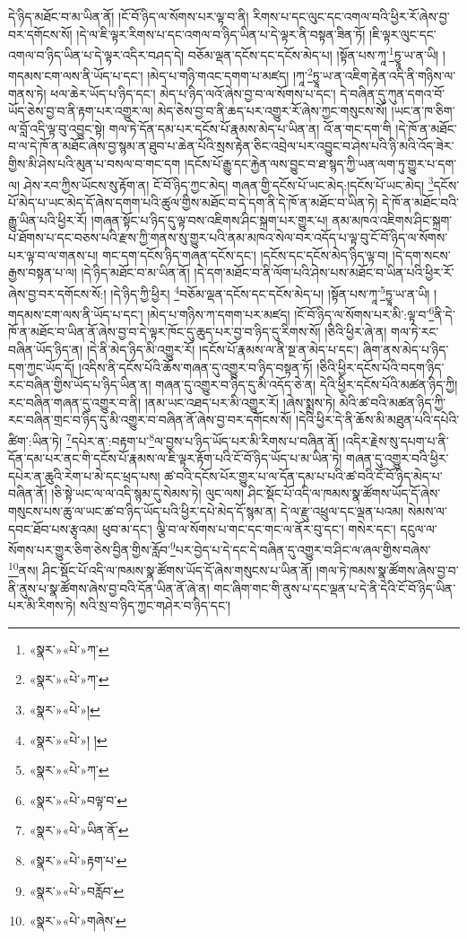 དེ་ཉིད་མཐོང་བ་མ་ཡིན་ནོ། །ངོ་བོ་ཉིད་ལ་སོགས་པར་ལྟ་བ་ནི། རིགས་པ་དང་ལུང་དང་འགལ་བའི་ཕྱིར་རོ་ཞེས་བྱ་བར་དགོངས་སོ། །དེ་ལ་ཇི་ལྟར་རིགས་པ་དང་འགལ་བ་ཉིད་ཡིན་པ་དེ་ལྟར་ནི་བསྟན་ཟིན་ཏོ། །ཇི་ལྟར་ལུང་དང་འགལ་བ་ཉིད་ཡིན་པ་དེ་ལྟར་འདིར་བཤད་དེ། བཅོམ་ལྡན་དངོས་དང་དངོས་མེད་པ། །སྟོན་པས་ཀཱ་\footnote{«སྣར་»«པེ་»ཀ་}ཏྱཱ་ཡ་ན་ཡི། །གདམས་ངག་ལས་ནི་ཡོད་པ་དང་། །མེད་པ་གཉི་གའང་དགག་པ་མཛད། །ཀཱ་\footnote{«སྣར་»«པེ་»ཀ་}ཏྱཱ་ཡ་ན་འཇིག་རྟེན་འདི་ནི་གཉིས་ལ་གནས་ཏེ། ཕལ་ཆེར་ཡོད་པ་ཉིད་དང་། མེད་པ་ཉིད་ལའོ་ཞེས་བྱ་བ་ལ་སོགས་པ་དང་། དེ་བཞིན་དུ་ཀུན་དགའ་བོ་ཡོད་ཅེས་བྱ་བ་ནི་རྟག་པར་འགྱུར་ལ། མེད་ཅེས་བྱ་བ་ནི་ཆད་པར་འགྱུར་རོ་ཞེས་ཀྱང་གསུངས་སོ། །ཡང་ན་ཁ་ཅིག་ལ་བློ་འདི་ལྟ་བུ་འབྱུང་སྟེ། གལ་ཏེ་དོན་དམ་པར་དངོས་པོ་རྣམས་མེད་པ་ཡིན་ན། འོ་ན་གང་དག་གི །དེ་ཁོ་ན་མཐོང་བ་ལ་དེ་ཁོ་ན་མཐོང་ཞེས་བྱ་སྙམ་ན་ཐུབ་པ་ཆེན་པོའི་སྲས་རྟེན་ཅིང་འབྲེལ་པར་འབྱུང་བ་ཤེས་པའི་ཉི་མའི་འོད་ཟེར་གྱིས་མི་ཤེས་པའི་མུན་པ་བསལ་བ་གང་དག །དངོས་པོ་རྒྱུ་དང་རྐྱེན་ལས་བྱུང་བ་ཐ་སྙད་ཀྱི་ཡན་ལག་ཏུ་གྱུར་པ་དག་ལ། ཤེས་རབ་ཀྱིས་ཡོངས་སུ་རྟོག་ན། ངོ་བོ་ཉིད་ཀྱང་མེད། གཞན་གྱི་དངོས་པོ་ཡང་མེད:།དངོས་པོ་ཡང་མེད། \footnote{«སྣར་»«པེ་»། }དངོས་པོ་མེད་པ་ཡང་མེད་དོ་ཞེས་དགག་པའི་ཚུལ་གྱིས་མཐོང་བ་དེ་དག་ནི་དེ་ཁོ་ན་མཐོང་བ་ཡིན་ཏེ། དེ་ཁོ་ན་མཐོང་བའི་རྒྱུ་ཡིན་པའི་ཕྱིར་རོ། །གཞན་སྟོང་པ་ཉིད་དུ་ལྟ་བས་འཇིགས་ཤིང་སྐྲག་པར་གྱུར་པ། ནམ་མཁའ་འཇིགས་ཤིང་སྐྲག་པ་ཐོགས་པ་དང་བཅས་པའི་རྫས་ཀྱི་གནས་སུ་གྱུར་པའི་ནམ་མཁའ་སེལ་བར་འདོད་པ་ལྟ་བུ་ངོ་བོ་ཉིད་ལ་སོགས་པར་ལྟ་བ་ལ་གནས་པ། གང་དག་དངོས་ཉིད་གཞན་དངོས་དང་། །དངོས་དང་དངོས་མེད་ཉིད་ལྟ་བ། །དེ་དག་སངས་རྒྱས་བསྟན་པ་ལ། །དེ་ཉིད་མཐོང་བ་མ་ཡིན་ནོ། །དེ་དག་མཐོང་བ་ནི་ལོག་པའི་ཤེས་པས་མཐོང་བ་ཡིན་པའི་ཕྱིར་རོ་ཞེས་བྱ་བར་དགོངས་སོ:། །དེ་ཉིད་ཀྱི་ཕྱིར། \footnote{«སྣར་»«པེ་»། ། }བཅོམ་ལྡན་དངོས་དང་དངོས་མེད་པ། །སྟོན་པས་ཀཱ་\footnote{«སྣར་»«པེ་»ཀ་}ཏྱཱ་ཡ་ན་ཡི། །གདམས་ངག་ལས་ནི་ཡོད་པ་དང་། །མེད་པ་གཉིས་ཀ་དགག་པར་མཛད། །ངོ་བོ་ཉིད་ལ་སོགས་པར་མི་:ལྟ་བ་\footnote{«སྣར་»«པེ་»བལྟ་བ་}ནི་དེ་ཁོ་ན་མཐོང་བ་ཡིན་ནོ་ཞེས་བྱ་བ་དེ་ལྟར་ཁོང་དུ་ཆུད་པར་བྱ་བ་ཉིད་དུ་རིགས་སོ། །ཅིའི་ཕྱིར་ཞེ་ན། གལ་ཏེ་རང་བཞིན་ཡོད་ཉིད་ན། །དེ་ནི་མེད་ཉིད་མི་འགྱུར་རོ། །དངོས་པོ་རྣམས་ལ་ནི་སྔ་ན་མེད་པ་དང་། ཞིག་ནས་མེད་པ་ཉིད་དག་ཀྱང་ཡོད་དོ། །འདིས་ནི་དངོས་པོའི་ཆོས་གཞན་དུ་འགྱུར་བ་ཉིད་བསྟན་ཏོ། །ཅིའི་ཕྱིར་དངོས་པོའི་བདག་ཉིད་རང་བཞིན་གྱིས་ཡོད་པ་ཉིད་ཡིན་ན། གཞན་དུ་འགྱུར་བ་ཉིད་དུ་མི་འདོད་ཅེ་ན། དེའི་ཕྱིར་དངོས་པོའི་མཚན་ཉིད་ཀྱི། རང་བཞིན་གཞན་དུ་འགྱུར་བ་ནི། །ནམ་ཡང་འཐད་པར་མི་འགྱུར་རོ། །ཞེས་སྨྲས་ཏེ། མེའི་ཚ་བའི་མཚན་ཉིད་ཀྱི་རང་བཞིན་གྲང་བ་ཉིད་དུ་མི་འགྱུར་བ་བཞིན་ནོ་ཞེས་བྱ་བར་དགོངས་སོ། །དེའི་ཕྱིར་དེ་ནི་ཆོས་མི་མཐུན་པའི་དཔེའི་ཚིག་:ཡིན་ཏེ། \footnote{«སྣར་»«པེ་»ཡིན་ནོ་}དཔེར་ན་:བརྟག་པ་\footnote{«སྣར་»«པེ་»རྟག་པ་}ལ་བྱས་པ་ཉིད་ཡོད་པར་མི་རིགས་པ་བཞིན་ནོ། །འདིར་རྗེས་སུ་དཔག་པ་ནི་དོན་དམ་པར་ནང་གི་དངོས་པོ་རྣམས་ལ་ཇི་ལྟར་རྟོག་པའི་ངོ་བོ་ཉིད་ཡོད་པ་མ་ཡིན་ཏེ། གཞན་དུ་འགྱུར་བའི་ཕྱིར་དཔེར་ན་ཆུའི་རེག་པ་མེ་དང་ཕྲད་པས། ཚ་བའི་དངོས་པོར་གྱུར་པ་ལ་དོན་དམ་པ་པའི་ཚ་བའི་ངོ་བོ་ཉིད་མེད་པ་བཞིན་ནོ། །ཅི་སྟེ་ཡང་ལ་ལ་འདི་སྙམ་དུ་སེམས་ཏེ། ལུང་ལས། ཤིང་སྡོང་པོ་འདི་ལ་ཁམས་སྣ་ཚོགས་ཡོད་དོ་ཞེས་གསུངས་པས་ཆུ་ལ་ཡང་ཚ་བ་ཉིད་ཡོད་པའི་ཕྱིར་དཔེ་མེད་དོ་སྙམ་ན། དེ་ལ་རྫུ་འཕྲུལ་དང་ལྡན་པའམ། སེམས་ལ་དབང་ཐོབ་པས་རྩྭའམ། ཕུབ་མ་དང་། ལྕི་བ་ལ་སོགས་པ་གང་དང་གང་ལ་ནོར་བུ་དང་། གསེར་དང་། དངུལ་ལ་སོགས་པར་གྱུར་ཅིག་ཅེས་བྱིན་གྱིས་རློབ་\footnote{«སྣར་»«པེ་»བརློབ་}པར་བྱེད་པ་དེ་དང་དེ་བཞིན་དུ་འགྱུར་བ་ཤིང་ལ་ཞལ་གྱིས་བཞེས་\footnote{«སྣར་»«པེ་»གཞེས་}ནས། ཤིང་སྡོང་པོ་འདི་ལ་ཁམས་སྣ་ཚོགས་ཡོད་དོ་ཞེས་གསུངས་པ་ཡིན་ནོ། །གལ་ཏེ་ཁམས་སྣ་ཚོགས་ཞེས་བྱ་བ་ནི་ནུས་པ་སྣ་ཚོགས་ཞེས་བྱ་བའི་དོན་ཡིན་ནོ་ཞེ་ན། གང་ཞིག་གང་གི་ནུས་པ་དང་ལྡན་པ་དེ་ནི་དེའི་ངོ་བོ་ཉིད་ཡིན་པར་མི་རིགས་ཏེ། སའི་སྲ་བ་ཉིད་ཀྱང་གཤེར་བ་ཉིད་དང་། 
